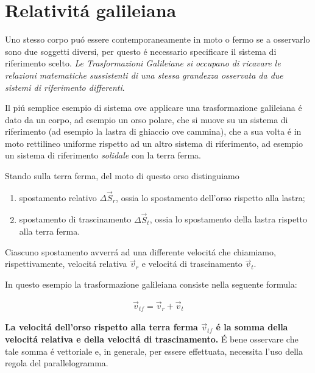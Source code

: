 \documentclass[17pt]{extarticle}
\begin{document}
\section{Relativit\'a galileiana}










Uno stesso corpo pu\'o essere contemporaneamente in moto o fermo se a osservarlo sono due soggetti diversi, per questo \'e necessario specificare il sistema di riferimento scelto. \emph{Le Trasformazioni Galileiane si occupano di ricavare le relazioni matematiche sussistenti di una stessa grandezza osservata da due sistemi di riferimento differenti}. 

Il pi\'u semplice esempio di sistema ove applicare una trasformazione galileiana \'e dato da un corpo, ad esempio un orso polare, che si muove su un sistema di riferimento (ad esempio la lastra di ghiaccio ove cammina), che a sua volta \'e in moto rettilineo uniforme rispetto ad un altro sistema di riferimento, ad esempio un sistema di riferimento \emph{solidale} con la terra ferma.

Stando sulla terra ferma, del moto di questo orso distinguiamo
\begin{enumerate}
	\item spostamento relativo $\Delta\vec{S}_r$, ossia lo spostamento dell'orso rispetto alla lastra;
	\item spostamento di trascinamento $\Delta\vec{S}_t$, ossia lo spostamento della lastra rispetto alla terra ferma.
\end{enumerate}

Ciascuno spostamento avverr\'a ad una differente velocit\'a che chiamiamo, rispettivamente, velocit\'a relativa $\vec{v}_r$ e velocit\'a di trascinamento $\vec{v}_t$.


In questo esempio la trasformazione galileiana consiste nella seguente formula:

\begin{eqnarray}\label{eq:galileo}
	\vec{v}_{tf} = \vec{v}_r + \vec{v}_t
\end{eqnarray}

{\bf La velocit\'a dell'orso rispetto alla terra ferma $\vec{v}_{tf}$ \'e la somma della velocit\'a relativa e della velocit\'a di trascinamento.} \'E bene osservare che tale somma \'e vettoriale e, in generale, per essere effettuata, necessita l'uso della regola del parallelogramma.
\end{document}

